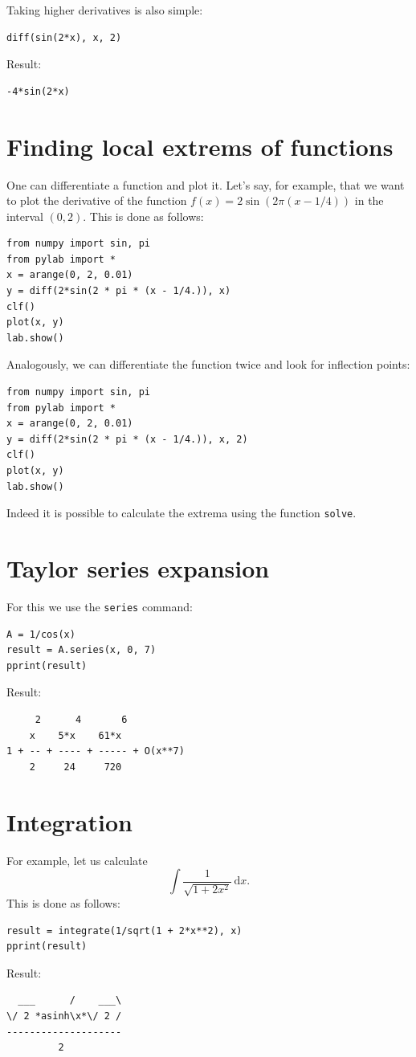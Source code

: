 \documentclass{article}
\begin{document}
Taking higher derivatives is also simple:
\begin{verbatim}
diff(sin(2*x), x, 2)
\end{verbatim}
Result:
\begin{verbatim}
-4*sin(2*x)
\end{verbatim}

\section{Finding local extrems of functions}

One can differentiate a function and plot it. Let's say, for example, that 
we want to plot the derivative of the function $f(x) = 2\sin(2\pi(x - 1/4))$
in the interval $(0, 2)$. This is done as follows:
\begin{verbatim}
from numpy import sin, pi
from pylab import *
x = arange(0, 2, 0.01)
y = diff(2*sin(2 * pi * (x - 1/4.)), x)
clf()
plot(x, y)
lab.show()
\end{verbatim}
Analogously, we can differentiate the function twice and look for inflection points:
\begin{verbatim}
from numpy import sin, pi
from pylab import *
x = arange(0, 2, 0.01)
y = diff(2*sin(2 * pi * (x - 1/4.)), x, 2)
clf()
plot(x, y)
lab.show()
\end{verbatim}
Indeed it is possible to calculate the extrema using the function {\tt solve}.

\section{Taylor series expansion}

For this we use the {\tt series} command:
\begin{verbatim}
A = 1/cos(x)
result = A.series(x, 0, 7)
pprint(result)
\end{verbatim}
Result:
\begin{verbatim}
     2      4       6          
    x    5*x    61*x           
1 + -- + ---- + ----- + O(x**7)
    2     24     720           
\end{verbatim}

\section{Integration}

For example, let us calculate 
$$
\int \frac{1}{\sqrt{1 + 2x^2}}\, \mbox{d} x.
$$
This is done as follows:
\begin{verbatim}
result = integrate(1/sqrt(1 + 2*x**2), x)
pprint(result)
\end{verbatim}
Result:
\begin{verbatim}
  ___      /    ___\
\/ 2 *asinh\x*\/ 2 /
--------------------
         2      
\end{verbatim}
\end{document}
